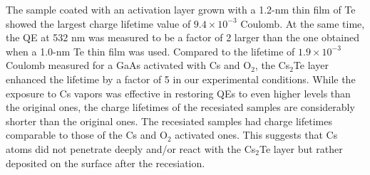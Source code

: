 The sample coated with an activation layer grown with a 1.2-nm thin film of Te showed the largest charge lifetime value of $9.4\times10^{-3}$  Coulomb. At the same time, the QE at 532 nm was measured to be a factor of 2 larger than the one obtained when a 1.0-nm Te thin film was used. 
Compared to the lifetime of $1.9\times10^{-3}$ Coulomb measured for a GaAs activated with Cs and O$_2$, the Cs$_2$Te layer enhanced the lifetime by a factor of 5 in our experimental conditions.
While the exposure to Cs vapors was effective in restoring QEs to even higher levels than the original ones, the charge lifetimes of the recesiated samples are considerably shorter than the original ones. The recesiated samples had charge lifetimes comparable to those of the Cs and O$_2$ activated ones. This suggests that Cs atoms did not penetrate deeply and/or react with the Cs$_2$Te layer but rather deposited on the surface after the recesiation.

